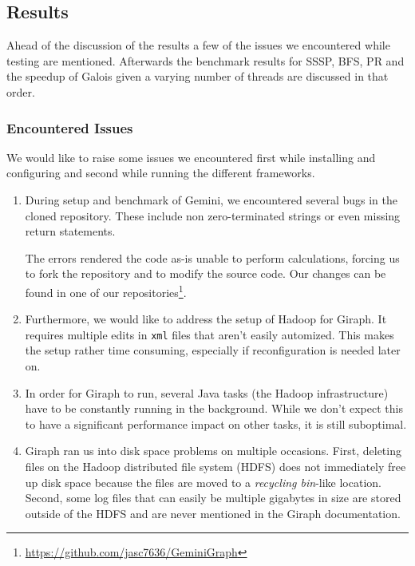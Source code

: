 
\subsection{Results}
Ahead of the discussion of the results a few of the issues we encountered while testing are mentioned. Afterwards the benchmark results for SSSP, BFS, PR and the speedup of Galois given a varying number of threads are discussed in that order.


\subsubsection{Encountered Issues}
We would like to raise some issues we encountered first while installing and configuring and second while running the different frameworks.

\begin{enumerate}
	\item During setup and benchmark of Gemini, we encountered several bugs in the cloned repository. These include non zero-terminated strings or even missing return statements.

	The errors rendered the code as-is unable to perform calculations, forcing us to fork the repository and to modify the source code. Our changes can be found in one of our repositories\footnote{\url{https://github.com/jasc7636/GeminiGraph}}.

	\item Furthermore, we would like to address the setup of Hadoop for Giraph. It requires multiple edits in \texttt{xml} files that aren't easily automized. This makes the setup rather time consuming, especially if reconfiguration is needed later on.
	\item In order for Giraph to run, several Java tasks (the Hadoop infrastructure) have to be constantly running in the background. While we don't expect this to have a significant performance impact on other tasks, it is still suboptimal.
	\item Giraph ran us into disk space problems on multiple occasions. First, deleting files on the Hadoop distributed file system (HDFS) does not immediately free up disk space because the files are moved to a \emph{recycling bin}-like location. Second, some log files that can easily be multiple gigabytes in size are stored outside of the HDFS and are never mentioned in the Giraph documentation.
\end{enumerate}


